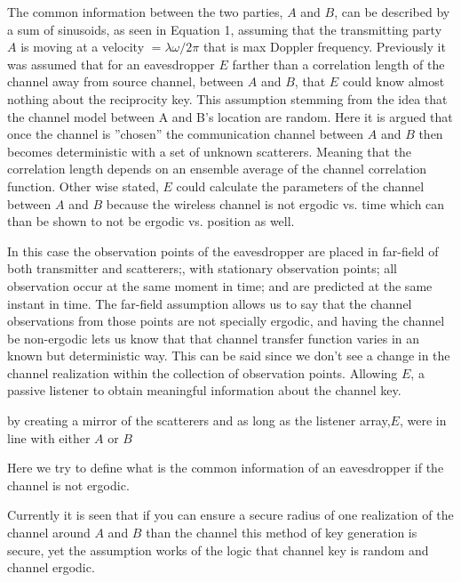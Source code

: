 \documentclass[11pt]{article} %
\begin{document}
The common information between the two parties, $A$ and $B$, can be described by a sum of sinusoids, as seen in Equation 1, assuming that the transmitting party $A$ is moving at a velocity $= \lambda \omega/2 \pi$ that is max Doppler frequency. Previously it was assumed that for an eavesdropper $E$ farther than a correlation length of the channel away from source channel, between $A$ and $B$, that $E$ could know almost nothing about the reciprocity key. This assumption stemming from the idea that the channel model between A and B's location are random. Here it is argued that once the channel is ''chosen'' the communication channel between $A$ and $B$ then becomes deterministic with a set of unknown scatterers.  Meaning that the correlation length depends on an ensemble average of the channel correlation function. Other wise stated, $E$ could calculate the parameters of the channel between $A$ and $B$ because the wireless channel is not ergodic vs. time \cite{isukapalli2006} which can than be shown to not be ergodic vs. position as well. 

In this case the observation points of the eavesdropper are placed in far-field of both transmitter and scatterers;, with stationary observation points; all observation occur at the same moment in time; and are predicted at the same instant in time. The far-field assumption allows us to say that the channel observations from those points are not specially ergodic, and having the channel be non-ergodic lets us know that that channel transfer function varies in an known but deterministic way.  This can be said since we don't see a change in the channel realization within the collection of observation points. Allowing $E$, a passive listener to obtain meaningful information about the channel key. 



 \bigskip by creating a mirror of the scatterers and as long as the listener array,$E$, were in line with either $A$ or $B$ 

Here we try to define what is the common information of an eavesdropper if the channel is not ergodic.
\bigskip



Currently it is seen that if you can ensure a secure radius of one realization of the channel around $A$ and $B$ than the channel this method of key generation is secure, yet the assumption works of the logic that channel key is random and channel ergodic. 
\end{document}
